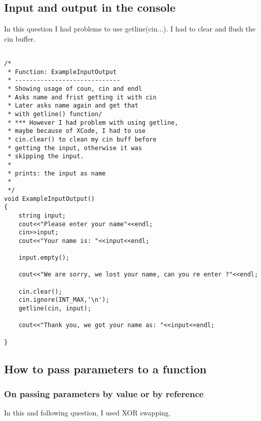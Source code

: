 \documentclass{article}
\begin{document}
	\subsection{Input and output in the console}
		In this question I had problems to use getline(cin...). I had to clear and flush the cin buffer.
\begin{lstlisting}[label=lab2_2_1-h,caption=Input and Output to console]
	
/*
 * Function: ExampleInputOutput
 * -----------------------------
 * Showing usage of coun, cin and endl
 * Asks name and frist getting it with cin
 * Later asks name again and get that 
 * with getline() function/
 * *** However I had problem with using getline,
 * maybe because of XCode, I had to use
 * cin.clear() to clean my cin buff before
 * getting the input, otherwise it was
 * skipping the input.
 *
 * prints: the input as name
 *
 */
void ExampleInputOutput()
{
    string input;
    cout<<"Please enter your name"<<endl;
    cin>>input;
    cout<<"Your name is: "<<input<<endl;
    
    input.empty();
    
    cout<<"We are sorry, we lost your name, can you re enter ?"<<endl;
    
    cin.clear();
    cin.ignore(INT_MAX,'\n');
    getline(cin, input);
    
    cout<<"Thank you, we got your name as: "<<input<<endl;

}
\end{lstlisting}		

	\subsection{How to pass parameters to a function}
		
		\subsubsection{On passing parameters by value or by reference}
		In this and following question, I used XOR swapping.
		
\end{document}
